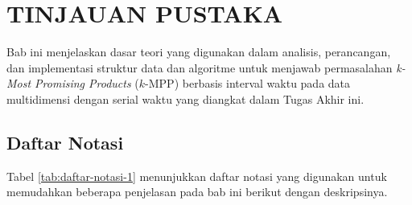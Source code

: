 
\chapter{TINJAUAN PUSTAKA} \label{chap:tinjauan-pustaka}
\tab Bab ini menjelaskan dasar teori yang digunakan dalam analisis, perancangan, dan implementasi struktur data dan algoritme untuk menjawab permasalahan \textit{k-Most Promising Products} ($k$-MPP) berbasis interval waktu pada data multidimensi dengan serial waktu yang diangkat dalam Tugas Akhir ini. 

\section{Daftar Notasi}
\tab Tabel \ref{tab:daftar-notasi-1} menunjukkan daftar notasi yang digunakan untuk memudahkan beberapa penjelasan pada bab ini berikut dengan deskripsinya.

